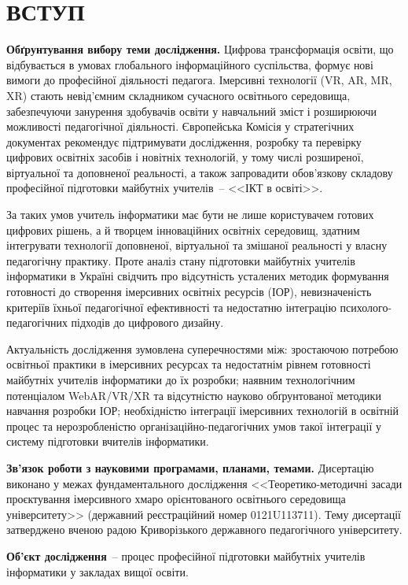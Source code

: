 \section*{\centering ВСТУП}

\textbf{Обґрунтування вибору теми дослідження.} Цифрова трансформація освіти, що відбувається в умовах глобального інформаційного суспільства, формує нові вимоги до професійної діяльності педагога. Імерсивні технології (VR, AR, MR, XR) стають невід'ємним складником сучасного освітнього середовища, забезпечуючи занурення здобувачів освіти у навчальний зміст і розширюючи можливості педагогічної діяльності. Європейська Комісія у стратегічних документах рекомендує підтримувати дослідження, розробку та перевірку цифрових освітніх засобів і новітніх технологій, у тому числі розширеної, віртуальної та доповненої реальності, а також запровадити обов'язкову складову професійної підготовки майбутніх учителів~-- <<ІКТ в освіті>>.

За таких умов учитель інформатики має бути не лише користувачем готових цифрових рішень, а й творцем інноваційних освітніх середовищ, здатним інтегрувати технології доповненої, віртуальної та змішаної реальності у власну педагогічну практику. Проте аналіз стану підготовки майбутніх учителів інформатики в Україні свідчить про відсутність усталених методик формування готовності до створення імерсивних освітніх ресурсів (ІОР), невизначеність критеріїв їхньої педагогічної ефективності та недостатню інтеграцію психолого-педагогічних підходів до цифрового дизайну.

Актуальність дослідження зумовлена суперечностями між: зростаючою потребою освітньої практики в імерсивних ресурсах та недостатнім рівнем готовності майбутніх учителів інформатики до їх розробки; наявним технологічним потенціалом WebAR/VR/XR та відсутністю науково обґрунтованої методики навчання розробки ІОР; необхідністю інтеграції імерсивних технологій в освітній процес та нерозробленістю організаційно-педагогічних умов такої інтеграції у систему підготовки вчителів інформатики.

\textbf{Зв'язок роботи з науковими програмами, планами, темами.} Дисертацію виконано у межах фундаментального дослідження <<Теоретико-методичні засади проєктування імерсивного хмаро орієнтованого освітнього середовища університету>> (державний реєстраційний номер 0121U113711). Тему дисертації затверджено вченою радою Криворізького державного педагогічного університету.

\textbf{Об'єкт дослідження}~-- процес професійної підготовки майбутніх учителів інформатики у закладах вищої освіти.


